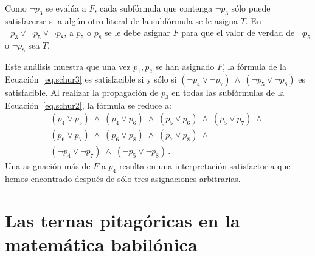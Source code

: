Como $\neg p_3$ se evalúa a $F$, cada subfórmula que contenga $\neg p_3$ sólo puede satisfacerse si a algún otro literal de la subfórmula se le asigna $T$. En $\neg p_3 \vee \neg p_5 \vee \neg p_8$, a $p_5$ o $p_8$ se le debe asignar $F$ para que el valor de verdad de $\neg p_5$ o $\neg p_8$ sea $T$.

Este análisis muestra que una vez $p_1,p_2$ se han asignado $F$, la fórmula de la Ecuación~\ref{eq.schur3} es satisfacible si y sólo si $(\neg p_4 \vee \neg p_7) \:\wedge\: (\neg p_5 \vee \neg p_8)$ es satisfacible. Al realizar la propagación de $p_3$ en todas las subfórmulas de la Ecuación~\ref{eq.schur2}, la fórmula se reduce a:
\[
\begin{array}{l}
(p_4\vee p_5)\;\wedge\;(p_4\vee p_6)\;\wedge\;(p_5\vee p_6)\;\wedge\;(p_5\vee p_7)\;\wedge\;\\
(p_6\vee p_7)\;\wedge\;(p_6\vee p_8)\;\wedge\;(p_7\vee p_8)\;\wedge\\
(\neg p_4\vee \neg p_7)\;\wedge\;
(\neg p_5\vee \neg p_8)\,.
\end{array}
\]
Una asignación más de $F$ a $p_4$ resulta en una interpretación satisfactoria que hemos encontrado después de sólo tres asignaciones arbitrarias.


\section{Las ternas pitagóricas en la matemática babilónica}\label{s.plimpton}

